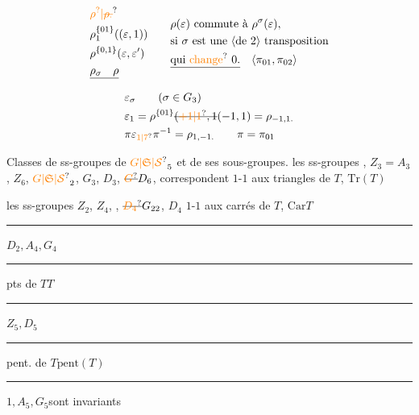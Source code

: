 \[
\begin{aligned}
&\unsure{\rho^{?}|\deleted{\rho_{\cdot}}}\qquad\\
&\rho_1^{\{01\}}((\varepsilon,1))\\
&\rho^{\{0,1\}}(\varepsilon,\varepsilon')\\
&\deleted{\rho_\sigma\quad\rho}
\end{aligned}
\qquad
\begin{aligned}
 &\rho(\varepsilon)\ \text{commute à}\ \rho^\sigma(\varepsilon),\\
 &\text{si }\sigma\text{ est une \inserted{de 2} transposition}\\
 &\deleted{\text{qui \unsure{change} }0.}\quad\inserted{\pi_{01},\pi_{02}}
\end{aligned}
\]
\[
\begin{aligned}
 &\varepsilon_\sigma\qquad(\sigma\in G_3)\\
 &\varepsilon_1=\rho^{\{01\}}\deleted{(\unsure{+1|1},1}(-1,1)=\rho_{-1,1.}\\
 &\pi\varepsilon_{\unsure{1|7}}\pi^{-1}=\rho_{1,-1.}\qquad\pi=\pi_{01}
\end{aligned}
\]

Classes de ss-groupes de ${\unsure{G|\mathfrak S|\mathcal S}}_5$ et de ses sous-groupes.
les ss-groupes , $Z_3=A_3$, $Z_6$, ${\unsure{G|\mathfrak S|\mathcal S}}_2$, $G_3$, $D_3$, $\deleted{\unsure{G}}D_6$, correspondent $1$-$1$ aux triangles de $T$, $\boxed{\mathrm{Tr}(T)}$

les ss-groupes $Z_2$, $Z_4$, , $\deleted{\unsure{D_4}}G_{22}$, $D_4$  $1$-$1$ aux carrés de $T$, $\boxed{\mathrm{Car}T}$

\noindent\rule{3.6em}{.4pt}\quad $D_2,A_4,G_4$\qquad\rule{5em}{.4pt}\quad pts de $T$\quad$\boxed{T}$

\noindent\rule{3.6em}{.4pt}\quad $Z_5,D_5$\qquad\rule{5em}{.4pt}\quad pent. de $T$\quad$\boxed{\mathrm{pent}(T)}$

\noindent\rule{3.6em}{.4pt}\quad $1,A_5,G_5$\quad sont invariants

